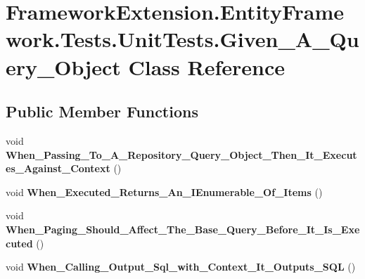 \hypertarget{class_framework_extension_1_1_entity_framework_1_1_tests_1_1_unit_tests_1_1_given___a___query___object}{\section{Framework\-Extension.\-Entity\-Framework.\-Tests.\-Unit\-Tests.\-Given\-\_\-\-A\-\_\-\-Query\-\_\-\-Object Class Reference}
\label{class_framework_extension_1_1_entity_framework_1_1_tests_1_1_unit_tests_1_1_given___a___query___object}
}
\subsection*{Public Member Functions}
\begin{DoxyCompactItemize}
\item 
\hypertarget{class_framework_extension_1_1_entity_framework_1_1_tests_1_1_unit_tests_1_1_given___a___query___object_a32af6d21858a66e33efea6bebb8f9aa1}{void {\bfseries When\-\_\-\-Passing\-\_\-\-To\-\_\-\-A\-\_\-\-Repository\-\_\-\-Query\-\_\-\-Object\-\_\-\-Then\-\_\-\-It\-\_\-\-Executes\-\_\-\-Against\-\_\-\-Context} ()}\label{class_framework_extension_1_1_entity_framework_1_1_tests_1_1_unit_tests_1_1_given___a___query___object_a32af6d21858a66e33efea6bebb8f9aa1}

\item 
\hypertarget{class_framework_extension_1_1_entity_framework_1_1_tests_1_1_unit_tests_1_1_given___a___query___object_a70e5ae60941103978d0bd592f2dff2a2}{void {\bfseries When\-\_\-\-Executed\-\_\-\-Returns\-\_\-\-An\-\_\-\-I\-Enumerable\-\_\-\-Of\-\_\-\-Items} ()}\label{class_framework_extension_1_1_entity_framework_1_1_tests_1_1_unit_tests_1_1_given___a___query___object_a70e5ae60941103978d0bd592f2dff2a2}

\item 
\hypertarget{class_framework_extension_1_1_entity_framework_1_1_tests_1_1_unit_tests_1_1_given___a___query___object_a84042acb712a792a38f9369cc8d2a6bc}{void {\bfseries When\-\_\-\-Paging\-\_\-\-Should\-\_\-\-Affect\-\_\-\-The\-\_\-\-Base\-\_\-\-Query\-\_\-\-Before\-\_\-\-It\-\_\-\-Is\-\_\-\-Executed} ()}\label{class_framework_extension_1_1_entity_framework_1_1_tests_1_1_unit_tests_1_1_given___a___query___object_a84042acb712a792a38f9369cc8d2a6bc}

\item 
\hypertarget{class_framework_extension_1_1_entity_framework_1_1_tests_1_1_unit_tests_1_1_given___a___query___object_a4b1dc3d91a71db13bc265ace09aee372}{void {\bfseries When\-\_\-\-Calling\-\_\-\-Output\-\_\-\-Sql\-\_\-with\-\_\-\-Context\-\_\-\-It\-\_\-\-Outputs\-\_\-\-S\-Q\-L} ()}\label{class_framework_extension_1_1_entity_framework_1_1_tests_1_1_unit_tests_1_1_given___a___query___object_a4b1dc3d91a71db13bc265ace09aee372}

\end{DoxyCompactItemize}
